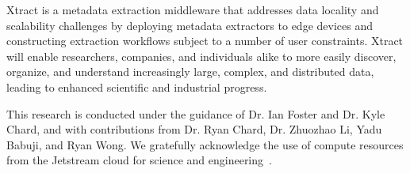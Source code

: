 \documentclass[sigconf, 9pt]{acmart}
\newcommand{\name}{Xtract}
\begin{document}
\name{} is a metadata extraction middleware that addresses data locality and 
scalability challenges by deploying metadata extractors to edge
devices and constructing extraction workflows subject to a number of user constraints. 
\name{} will enable researchers, companies, and individuals alike to more easily 
discover, organize, and understand increasingly large, complex, and distributed 
data, leading to enhanced scientific and industrial progress. 


\begin{acks}

This research is conducted under the guidance of Dr. Ian Foster and Dr. Kyle Chard, and with contributions
from Dr. Ryan Chard, Dr. Zhuozhao Li, Yadu Babuji, and Ryan Wong. We gratefully acknowledge the use of compute 
resources from the Jetstream cloud for science and engineering~\cite{jetstream}.


\end{acks}


\end{document}
